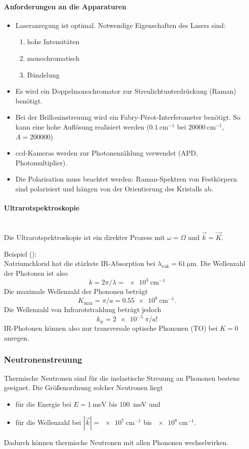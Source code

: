 	\paragraph{Anforderungen an die Apparaturen}
	\begin{itemize}
		\item Laseranregung ist optimal. Notwendige Eigenschaften des Lasers sind:
			\begin{enumerate}
				\item hohe Intensitäten
				\item monochromatisch
				\item Bündelung	
			\end{enumerate}
		\item Es wird ein Doppelmonochromator zur Streulichtunterdrückung (Raman) benötigt.
		\item Bei der Brillouinstreuung wird ein Fabry-Pérot-Interferometer benötigt.
			So kann eine hohe Auflösung realisiert werden ($\SI{0.1}{\centi\meter^{-1}}$ bei $\SI{20000}{\centi \meter^{-1}}$, $A = \num{200000}$)
		\item ccd-Kameras werden zur Photonenzählung verwendet (APD, Photomultiplier).
		\item Die Polarisation muss beachtet werden: Raman-Spektren von Festkörpern sind polarisiert und hängen von der Orientierung des Kristalls ab.
	\end{itemize}

\paragraph{Ultrarotspektroskopie}\,\\ 
	Die Ultrarotspektroskopie ist ein direkter Prozess mit $\omega = \Omega$ und $\Vec{k} = \Vec{K}$.

	{Beispiel ():}\\
	Natriumchlorid hat die stärkste IR-Absorption bei $\lambda_{\text{vak}} = \SI{61}{\micro \meter}$.
	Die Wellenzahl der Photonen ist also 
	$$k = 2\pi/\lambda = \SI{e3}{\centi \meter ^{-1}}$$
	Die maximale Wellenzahl der Phononen beträgt 
	$$K_{\text{max}} = \pi / a = \SI{0,55e8}{\centi \meter ^{-1}}.$$
	Die Wellenzahl von Infrarotstrahlung beträgt jedoch
	$$k_{\text{ir}} = \SI{2e-5}{\pi \per a}!$$
	IR-Photonen können also nur transversale optische Phononen (TO) bei $K=0$ anregen.

\subsubsection{Neutronenstreuung}
	Thermische Neutronen sind für die inelastische Streuung an Phononen bestens geeignet. 
	Die Größenordnung solcher Neutronen liegt
	\begin{itemize}
		\item für die Energie bei $E = \SI{1}{\milli \electronvolt}$ bis \SI{100}{\milli \electronvolt} und
		\item für die Wellenzahl bei $|\Vec{k}| = \SI{e7}{\centi \meter ^{-1}}$ bis $\SI{e8}{\centi \meter ^{-1}}$.
	\end{itemize}
	Dadurch können thermische Neutronen mit allen Phononen wechselwirken.


